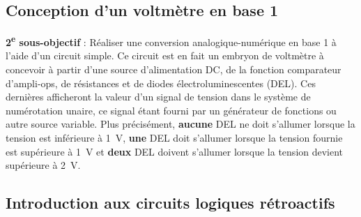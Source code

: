 \documentclass[canadien,12pt,oneside,letterpaper]{article}
\begin{document}
\subsection{Conception d'un voltmètre en base 1}

\noindent\textbf{2\textsuperscript{e} sous-objectif} : Réaliser une conversion analogique-numérique en base 1 à l'aide d'un circuit simple. Ce circuit est en fait un embryon de voltmètre à concevoir à partir d'une source d'alimentation DC, de la fonction comparateur d'ampli-ops, de résistances et de diodes électroluminescentes (DEL). Ces dernières afficheront la valeur d'un signal de tension dans le système de numérotation unaire, ce signal étant fourni par un générateur de fonctions ou autre source variable. Plus précisément, \textbf{aucune} DEL ne doit s'allumer lorsque la tension est inférieure à 1~V, \textbf{une} DEL doit s'allumer lorsque la tension fournie est supérieure à 1~V et \textbf{deux} DEL doivent s'allumer lorsque la tension devient supérieure à 2~V.

\subsection{Introduction aux circuits logiques rétroactifs}


\end{document}
